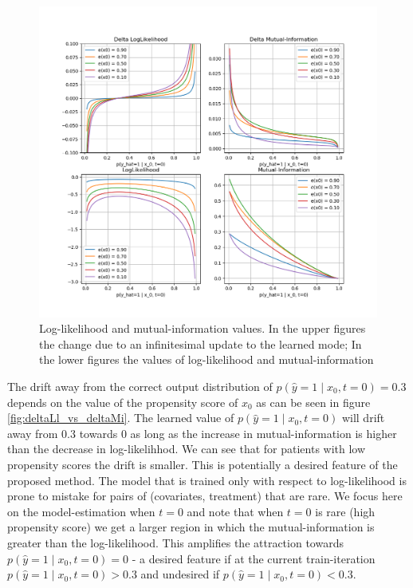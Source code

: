 \documentclass[oneside,12pt]{article}
\begin{document}
%
\begin{figure}
    \centering
        \includegraphics[width=1.0\textwidth]{./LL_MI}
        \caption{\label{fig:LL_MI}Log-likelihood and mutual-information values. In the upper figures the change due to an infinitesimal update to the learned mode; In the lower figures the values of log-likelihood and mutual-information}
\end{figure}
%
The drift away from the correct output distribution of $p(\hat{y} = 1 \mid x_0, t=0)=0.3$ depends on the value of the propensity score of $x_0$ as can be seen in figure \ref{fig:deltaLl_vs_deltaMi}. The learned value of $p(\hat{y} = 1 \mid x_0, t=0)$ will drift away from $0.3$ towards $0$ as long as the increase in mutual-information is higher than the decrease in log-likelihhod. We can see that for patients with low propensity scores the drift is smaller. This is potentially a desired feature of the proposed method. The model that is trained only with respect to log-likelihood is prone to mistake for pairs of (covariates, treatment) that are rare. We focus here on the model-estimation when $t=0$ and note that when $t=0$ is rare (high propensity score) we get a larger region in which the mutual-information is greater than the log-likelihood. This amplifies the attraction towards $p(\hat{y} = 1 \mid x_0, t=0) = 0$ - a desired feature if at the current train-iteration $p(\hat{y} = 1 \mid x_0, t=0) > 0.3$ and undesired if $p(\hat{y} = 1 \mid x_0, t=0) < 0.3$.\\\\
\end{document}
